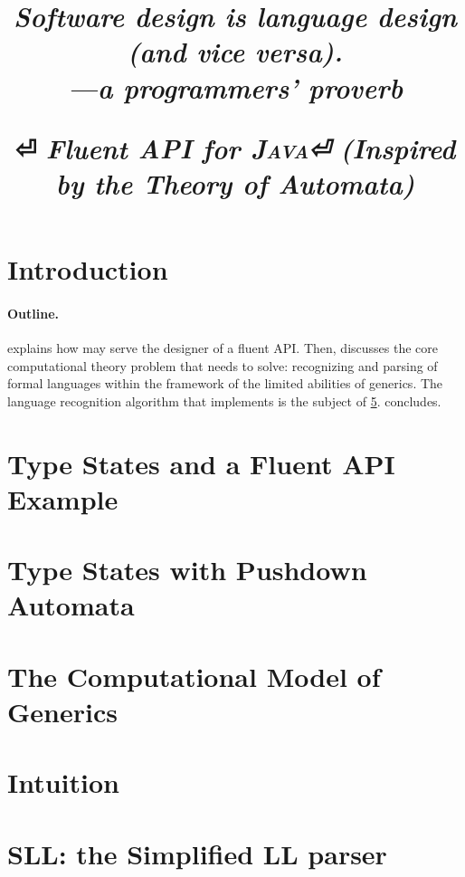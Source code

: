 \documentclass[nonatbib,preprint,numbers]{sigplanconf}
\title
{%
  \begin{flushright}
    \textcolor{blue!20!black}
    {\footnotesize\mdseries\slshape
      \renewcommand\baselinestretch{0.3}
      Software design is language design\\
      (and vice versa).\vspace{-4ex}\tiny\\
      \renewcommand\baselinestretch{0.3}
      ---a programmers' proverb
    }
  \end{flushright}
  \Huge \Fajita⏎
  \huge \itshape \textbf Fluent \textbf API for \textsc{\textbf Java}⏎
  \LARGE (\textbf Inspired by the \textbf Theory of \textbf Automata)
}
\begin{document}
\maketitle
\begin{abstract}
  
\end{abstract}

\section{Introduction}


\paragraph{Outline.}  explains how \Fajita may serve the
designer of a fluent API\@.
Then,  discusses the core computational theory problem
that \Fajita needs to solve: recognizing and parsing of formal languages within
the framework of the limited abilities of \Java generics.  The language
recognition algorithm that \Fajita implements is the subject of
\cref{section:intuition}.   concludes.

\section{Type States and a Fluent API Example}
\label{section:example}


\section{Type States with Pushdown Automata}
\label{section:generalization}


\section{The Computational Model of \protect\Java Generics}
\label{section:background}


\section{Intuition}
\label{section:intuition}


\section{SLL: the Simplified LL parser}
\label{section:sll}

\end{document}
